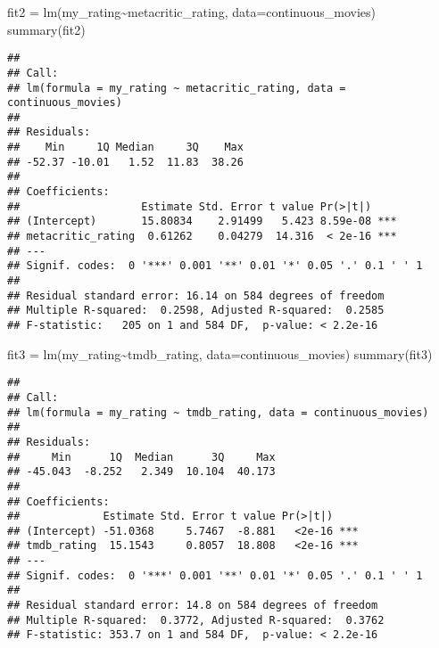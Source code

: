 \documentclass[
]{article}
\newenvironment{Shaded}{\begin{snugshade}}{\end{snugshade}}
\newcommand{\AttributeTok}[1]{\textcolor[rgb]{0.77,0.63,0.00}{#1}}
\newcommand{\FunctionTok}[1]{\textcolor[rgb]{0.00,0.00,0.00}{#1}}
\newcommand{\NormalTok}[1]{#1}
\newcommand{\OtherTok}[1]{\textcolor[rgb]{0.56,0.35,0.01}{#1}}
\newcommand{\SpecialCharTok}[1]{\textcolor[rgb]{0.00,0.00,0.00}{#1}}
\begin{document}
\begin{Shaded}
\begin{Highlighting}[]
\NormalTok{fit2 }\OtherTok{=} \FunctionTok{lm}\NormalTok{(my\_rating}\SpecialCharTok{\textasciitilde{}}\NormalTok{metacritic\_rating, }\AttributeTok{data=}\NormalTok{continuous\_movies)}
\FunctionTok{summary}\NormalTok{(fit2)}
\end{Highlighting}
\end{Shaded}

\begin{verbatim}
## 
## Call:
## lm(formula = my_rating ~ metacritic_rating, data = continuous_movies)
## 
## Residuals:
##    Min     1Q Median     3Q    Max 
## -52.37 -10.01   1.52  11.83  38.26 
## 
## Coefficients:
##                   Estimate Std. Error t value Pr(>|t|)    
## (Intercept)       15.80834    2.91499   5.423 8.59e-08 ***
## metacritic_rating  0.61262    0.04279  14.316  < 2e-16 ***
## ---
## Signif. codes:  0 '***' 0.001 '**' 0.01 '*' 0.05 '.' 0.1 ' ' 1
## 
## Residual standard error: 16.14 on 584 degrees of freedom
## Multiple R-squared:  0.2598, Adjusted R-squared:  0.2585 
## F-statistic:   205 on 1 and 584 DF,  p-value: < 2.2e-16
\end{verbatim}

\begin{Shaded}
\begin{Highlighting}[]
\NormalTok{fit3 }\OtherTok{=} \FunctionTok{lm}\NormalTok{(my\_rating}\SpecialCharTok{\textasciitilde{}}\NormalTok{tmdb\_rating, }\AttributeTok{data=}\NormalTok{continuous\_movies)}
\FunctionTok{summary}\NormalTok{(fit3)}
\end{Highlighting}
\end{Shaded}

\begin{verbatim}
## 
## Call:
## lm(formula = my_rating ~ tmdb_rating, data = continuous_movies)
## 
## Residuals:
##     Min      1Q  Median      3Q     Max 
## -45.043  -8.252   2.349  10.104  40.173 
## 
## Coefficients:
##             Estimate Std. Error t value Pr(>|t|)    
## (Intercept) -51.0368     5.7467  -8.881   <2e-16 ***
## tmdb_rating  15.1543     0.8057  18.808   <2e-16 ***
## ---
## Signif. codes:  0 '***' 0.001 '**' 0.01 '*' 0.05 '.' 0.1 ' ' 1
## 
## Residual standard error: 14.8 on 584 degrees of freedom
## Multiple R-squared:  0.3772, Adjusted R-squared:  0.3762 
## F-statistic: 353.7 on 1 and 584 DF,  p-value: < 2.2e-16
\end{verbatim}
\end{document}
